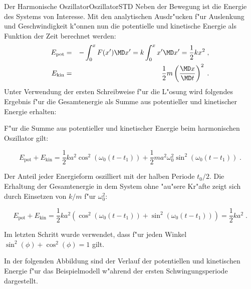 \begin{MXContent}{Der Harmonische Oszillator}{Oszillator}{STD}
Neben der Bewegung ist die Energie des Systems von Interesse. Mit den analytischen Ausdr"ucken f"ur Auslenkung und Geschwindigkeit k"onnen nun die potentielle und kinetische Energie als Funktion der Zeit berechnet werden:
\begin{eqnarray}
  E_\mathrm{pot} &=& -\int_0^x F(x') \MD x' = k \int_0^x x' \MD x' = \frac{1}{2} k x^2\; ,\\
  E_\mathrm{kin} &=& \frac{1}{2} m \left(\frac{\MD x}{\MD t}\right)^2\; .
\end{eqnarray}
Unter Verwendung der ersten Schreibweise f"ur die L"osung wird folgendes Ergebnis f"ur die Gesamtenergie als Summe aus potentieller und kinetischer Energie erhalten:

\begin{MInfo}
F"ur die Summe aus potentieller und kinetischer Energie beim harmonischen Oszillator gilt:

\begin{equation}
  E_{\text{pot}} + E_{\text{kin}} = \frac{1}{2} k a^2 \cos^2\left( \omega_0(t-t_1)\right)+\frac{1}{2} m a^2 \omega_0^2 \sin^2\left(\omega_0(t-t_1)\right)\;.
\end{equation}

Der Anteil jeder Energieform oszilliert mit der halben Periode $t_0/2$. Die Erhaltung der Gesamtenergie in dem System ohne "au"sere Kr"afte zeigt sich durch Einsetzen von $k/m$ f"ur $\omega_0^2$:

\begin{equation}
  E_{\text{pot}} + E_{\text{kin}} = \frac{1}{2} k a^2 \left(\cos^2\left( \omega_0(t-t_1)\right)+ \sin^2\left(\omega_0(t-t_1)\right)\right) = \frac{1}{2} k a^2 \;.
\end{equation}

Im letzten Schritt wurde verwendet, dass f"ur jeden Winkel $\sin^2(\phi) + \cos^2(\phi) = 1$ gilt.

\end{MInfo}

\begin{MExample}
In der folgenden Abbildung sind der Verlauf der potentiellen und kinetischen Energie f"ur das Beispielmodell w"ahrend der ersten Schwingungsperiode dargestellt.

\begin{center}
  \end{center}


\end{MExample}
\end{MXContent}
